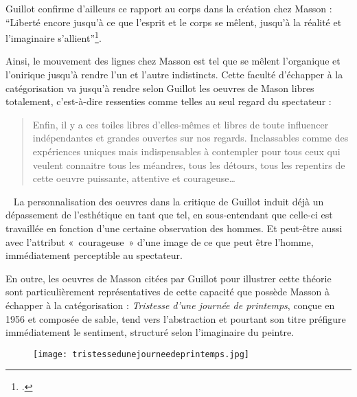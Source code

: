 	
	 Guillot confirme d’ailleurs ce rapport au corps dans la création chez Masson : \enquote{Liberté encore jusqu’à ce que l’esprit et le corps se mêlent, jusqu’à la réalité et l’imaginaire s’allient}\footcite{massonlyon}. 

	Ainsi, le mouvement des lignes chez Masson est tel que se mêlent l’organique et l’onirique jusqu’à rendre l’un et l’autre indistincts. Cette faculté d’échapper à la catégorisation va jusqu’à rendre selon Guillot les oeuvres de Mason libres totalement, c’est-à-dire ressenties comme telles au seul regard du spectateur : 

	\begin{quote}
	Enfin, il y a ces toiles libres d’elles-mêmes et libres de toute influencer indépendantes et grandes ouvertes sur nos regards. Inclassables comme des expériences  uniques mais indispensables à contempler pour tous ceux qui veulent connaitre tous les méandres, tous les détours, tous les repentirs de cette oeuvre puissante, attentive et courageuse… 	
	\end{quote}
 
	 La personnalisation des oeuvres dans la critique de Guillot induit déjà un dépassement de l’esthétique en tant que tel, en sous-entendant que celle-ci est travaillée en fonction d’une certaine observation des hommes. Et peut-être aussi avec l’attribut « courageuse » d’une image de ce que peut être l’homme, immédiatement perceptible au spectateur.  

En outre, les oeuvres de Masson citées par Guillot pour illustrer cette théorie sont particulièrement représentatives de cette capacité que possède Masson à échapper à la catégorisation : \emph{Tristesse d’une journée de printemps}, conçue en 1956 et composée de sable, tend vers l’abstraction et pourtant son titre préfigure immédiatement le sentiment, structuré selon l’imaginaire du peintre. 


\begin{figure}[H]
   \centering
   \texttt{[image: tristessedunejourneedeprintemps.jpg]}
	\caption{\cite{tristesse}}\label{fig:Tristessedunejourneedeprintemps}
\end{figure}

